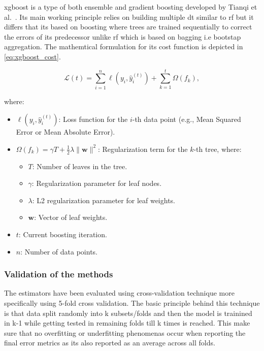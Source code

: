 \ac{xgboost} is a type of both ensemble and gradient boosting developed by Tianqi et al.~\citep{chen2016xgboost}. Its main working principle relies on building multiple \ac{dt} similar to 
\ac{rf} but it differs that its based on boosting where trees are trained sequentially to correct the errors of its predecessor unlike \ac{rf} which is based on bagging i.e bootstap aggregation. 
The mathemtical formulation for its cost function is depicted in \cref{eq:xgboost_cost}.

\begin{equation}
\mathcal{L}(t) = \sum_{i=1}^n \ell(y_i, \hat{y}_i^{(t)}) + \sum_{k=1}^t \Omega(f_k),
\label{eq:xgboost_cost}
\end{equation}

where:
\begin{itemize}
    \item \( \ell(y_i, \hat{y}_i^{(t)}) \): Loss function for the \(i\)-th data point (e.g., Mean Squared Error or Mean Absolute Error).
    \item \( \Omega(f_k) = \gamma T + \frac{1}{2} \lambda \|\mathbf{w}\|^2 \): Regularization term for the \(k\)-th tree, where:
    \begin{itemize}
        \item \( T \): Number of leaves in the tree.
        \item \( \gamma \): Regularization parameter for leaf nodes.
        \item \( \lambda \): L2 regularization parameter for leaf weights.
        \item \( \mathbf{w} \): Vector of leaf weights.
    \end{itemize}
    \item \( t \): Current boosting iteration.
    \item \( n \): Number of data points.
\end{itemize}

\subsubsection{Validation of the methods}\label{sec:validation_of_the_methods}

The estimators have been evaluated using cross-validation technique more specifically using 5-fold cross validation. 
The basic principle behind this technique is that data split randomly into k subsets/folds and then the model is trainined in k-1 while getting tested in remaining folds till k times is reached.
This make sure that no overfitting or underfitting phenomenas occur when reporting the final error metrics as its also reported as an average across all folds. 

